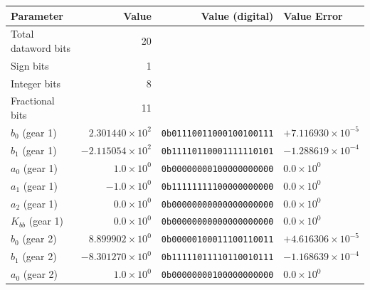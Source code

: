 \begin{table}[h!]
	\centering
	\def\arraystretch{1.5}		
	\setlength\arrayrulewidth{0.75pt}
	\setlength{\tabcolsep}{1em} %
	\begin{tabular}{|l|r|r|l|}
		\hline 
		\rule[-1ex]{0pt}{2.5ex} \cellcolor{gray!40}\textbf{Parameter} & \cellcolor{gray!40}\textbf{Value} & \cellcolor{gray!40}\textbf{Value (digital) } & \cellcolor{gray!40}\textbf{Value Error}\\ 
		\hline 
		\rule[-1ex]{0pt}{2.5ex} Total dataword bits  & 20 & & \\ 
		\hline 
		\rule[-1ex]{0pt}{2.5ex} Sign bits  & 1 & & \\ 
		\hline 
		\rule[-1ex]{0pt}{2.5ex} Integer bits & 8 & & \\ 
		\hline 
		\rule[-1ex]{0pt}{2.5ex} Fractional bits  & 11 & & \\ 
		\hline 
		\rule[-1ex]{0pt}{2.5ex} \textbf{$b_0$} {\color{red} (gear 1)} & $2.301440\times10^2$ & \texttt{0b01110011000100100111}  & $+7.116930\times10^{-5}$\\
		\hline 
		\rule[-1ex]{0pt}{2.5ex} \textbf{$b_1$} {\color{red} (gear 1)} & $-2.115054\times10^2$ & \texttt{0b11110110001111110101}  & $-1.288619\times10^{-4}$\\
		\hline 
		\rule[-1ex]{0pt}{2.5ex} \textbf{$a_0$} {\color{red} (gear 1)} & $1.0\times10^0$ & \texttt{0b00000000100000000000} & $0.0\times10^0$ \\ 
		\hline 
		\rule[-1ex]{0pt}{2.5ex} \textbf{$a_1$} {\color{red} (gear 1)} & $-1.0\times10^0$ & \texttt{0b11111111100000000000} & $0.0\times10^0$ \\ 
		\hline 
		\rule[-1ex]{0pt}{2.5ex} \textbf{$a_2$} {\color{red} (gear 1)} & $0.0\times10^0$ & \texttt{0b00000000000000000000} & $0.0\times10^0$ \\ 
		\hline 
		\rule[-1ex]{0pt}{2.5ex} \textbf{$K_{bb}$} {\color{red} (gear 1)} & $0.0\times10^0$ & \texttt{0b00000000000000000000} & $0.0\times10^0$ \\ 
		\hline 
		\rule[-1ex]{0pt}{2.5ex} \textbf{$b_0$} {\color{blue} (gear 2)} & $8.899902\times10^0$ & \texttt{0b00000100011100110011}  & $+4.616306\times10^{-5}$\\
		\hline 
		\rule[-1ex]{0pt}{2.5ex} \textbf{$b_1$} {\color{blue} (gear 2)} & $-8.301270\times10^0$ & \texttt{0b11111011110110010111}  & $-1.168639\times10^{-4}$\\
		\hline 
		\rule[-1ex]{0pt}{2.5ex} \textbf{$a_0$} {\color{blue} (gear 2)} & $1.0\times10^0$ & \texttt{0b00000000100000000000} & $0.0\times10^0$ \\ 

\end{tabular}
\end{table}
